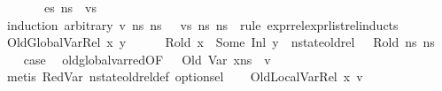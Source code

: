 \begin{isabellebody}
\ \ \ \ \ {\isasymLambda}{\isacharprime}{\kern0pt}{\isacharcomma}{\kern0pt}{\isasymGamma}{\isacharcomma}{\kern0pt}{\isasymOmega}\ {\isasymturnstile}\ {\isasymlangle}es{}{\isacharcomma}{\kern0pt}\ ns{}{\isasymrangle}\ {\isacharbrackleft}{\kern0pt}{\isasymDown}{\isacharbrackright}{\kern0pt}\ vs{\isachardoublequoteclose}\ \isanewline
%
\isadelimproof
%
\endisadelimproof
%
\isatagproof
{}\isamarkupfalse%
\ {\isacharparenleft}{\kern0pt}induction\ arbitrary{\isacharcolon}{\kern0pt}\ v\ ns{}\ ns{}\ {\isasymOmega}\ \ vs\ ns{}\ ns{}\ {\isasymOmega}\ rule{\isacharcolon}{\kern0pt}\ expr{\isacharunderscore}{\kern0pt}rel{\isacharunderscore}{\kern0pt}expr{\isacharunderscore}{\kern0pt}list{\isacharunderscore}{\kern0pt}rel{\isachardot}{\kern0pt}inducts{\isacharparenright}{\kern0pt}\isanewline
{}\isamarkupfalse%
\isanewline
\ \ \isamarkupfalse%
\ {\isacharparenleft}{\kern0pt}OldGlobalVar{\isacharunderscore}{\kern0pt}Rel\ x\ y{\isacharparenright}{\kern0pt}\ \ \isanewline
\ \ \isamarkupfalse%
\ {\isacartoucheopen}R{\isacharunderscore}{\kern0pt}old\ x\ {\isacharequal}{\kern0pt}\ Some\ {\isacharparenleft}{\kern0pt}Inl\ y{\isacharparenright}{\kern0pt}{\isacartoucheclose}\ \ {\isacartoucheopen}nstate{\isacharunderscore}{\kern0pt}old{\isacharunderscore}{\kern0pt}rel\ {\isasymLambda}\ {\isasymLambda}{\isacharprime}{\kern0pt}\ R{\isacharunderscore}{\kern0pt}old\ ns{}\ ns{}{\isacartoucheclose}\isanewline
\ \ \isamarkupfalse%
\ {\isacharquery}{\kern0pt}case\ \isamarkupfalse%
\ old{\isacharunderscore}{\kern0pt}global{\isacharunderscore}{\kern0pt}var{\isacharunderscore}{\kern0pt}red{\isacharbrackleft}{\kern0pt}OF\ {\isacartoucheopen}{\isasymLambda}{\isacharcomma}{\kern0pt}{\isasymGamma}{\isacharcomma}{\kern0pt}{\isasymOmega}\ {\isasymturnstile}\ {\isasymlangle}Old\ {\isacharparenleft}{\kern0pt}Var\ x{\isacharparenright}{\kern0pt}{\isacharcomma}{\kern0pt}ns{}{\isasymrangle}\ {\isasymDown}\ v{\isacartoucheclose}{\isacharbrackright}{\kern0pt}\isanewline
\ \ \ \ \isamarkupfalse%
\ {\isacharparenleft}{\kern0pt}metis\ RedVar\ nstate{\isacharunderscore}{\kern0pt}old{\isacharunderscore}{\kern0pt}rel{\isacharunderscore}{\kern0pt}def\ option{\isachardot}{\kern0pt}sel{\isacharparenright}{\kern0pt}\isanewline
{}\isamarkupfalse%
\isanewline
\ \ \isamarkupfalse%
\ {\isacharparenleft}{\kern0pt}OldLocalVar{\isacharunderscore}{\kern0pt}Rel\ x\ v{\isacharprime}{\kern0pt}{\isacharparenright}{\kern0pt}\isanewline

\end{isabellebody}
